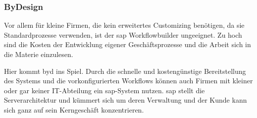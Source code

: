 
\subsubsection{ByDesign}

Vor allem für kleine Firmen, die kein erweitertes Customizing benötigen, da sie Standardprozesse verwenden, ist der \gls{sap} Workflowbuilder ungeeignet. Zu hoch sind die Kosten der Entwicklung eigener Geschäftsprozesse und die Arbeit sich in die Materie einzulesen.

Hier kommt \gls{byd} ins Spiel. Durch die schnelle und kostengünstige Bereitstellung des Systems und die vorkonfigurierten Workflows können auch Firmen mit kleiner oder gar keiner IT-Abteilung ein \gls{sap}-System nutzen. \gls{sap} stellt die Serverarchitektur und kümmert sich um deren Verwaltung und der Kunde kann sich ganz auf sein Kerngeschäft konzentrieren.

